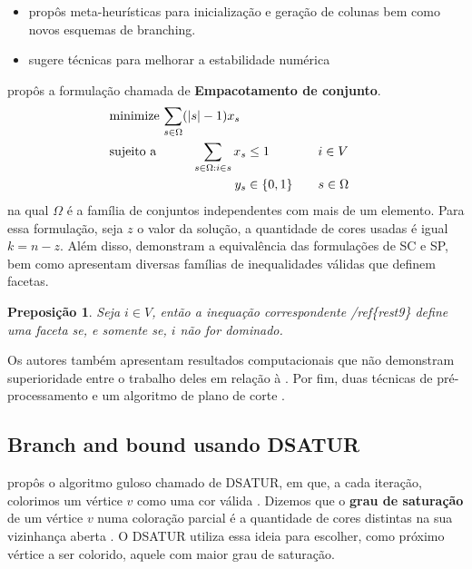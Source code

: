 \documentclass[11pt]{article}
\newtheorem{prep}{Preposição}[section]
\begin{document}
\begin{itemize}
\item \textcite{Malaguti2011ExactApproachVertex} propôs meta-heurísticas para inicialização e geração de colunas bem como novos esquemas de branching.
\item \textcite{Held2012Maximumweightstable} sugere técnicas para melhorar a estabilidade numérica
\end{itemize}

\textcite{Hansen2009Setcoveringpacking} propôs a formulação chamada de \textbf{Empacotamento de conjunto}.
\begin{alignat*}{4}
& \omit\rlap{minimize  $\displaystyle \sum_{s \in \Omega} (|s| - 1)x_s$} \\
& \mbox{sujeito a}&& \quad & \sum_{s \in \Omega: i \in s} x_{s}&\leq 1 & \quad & i \in V \\
&                 &&   & y_s       & \in \{0,1\} &    & s \in \Omega
\end{alignat*}
na qual \(\Omega\) é a família de conjuntos independentes com mais de um elemento.
Para essa formulação, seja \(z\) o valor da solução, a quantidade de cores usadas é igual \(k = n - z\).
Além disso, \textcite{Hansen2009Setcoveringpacking} demonstram a equivalência das formulações de SC e SP, bem como apresentam diversas famílias de inequalidades válidas que definem facetas.

\begin{prep}
\textcite{Hansen2009Setcoveringpacking} Seja \(i \in V\), então a inequação correspondente /ref\{rest9\} define uma faceta se, e somente se, \(i\) não for dominado.
\end{prep}

Os autores também apresentam resultados computacionais que não demonstram superioridade entre o trabalho deles em relação à \textcite{Mehrotra1996ColumnGenerationApproach}.
Por fim, duas técnicas de pré-processamento e um algoritmo de plano de corte .
\subsection{Branch and bound usando DSATUR}
\label{sec:org88b284c}

\textcite{Brelaz1979Newmethodscolor} propôs o algoritmo guloso chamado de DSATUR, em que, a cada iteração, colorimos um vértice \(v\) como uma cor válida .
Dizemos que o \textbf{grau de saturação}  de um vértice \(v\) numa coloração parcial  é a quantidade de cores distintas na sua vizinhança aberta .
O DSATUR utiliza essa ideia para escolher, como próximo vértice a ser colorido, aquele com maior grau de saturação.
\end{document}
